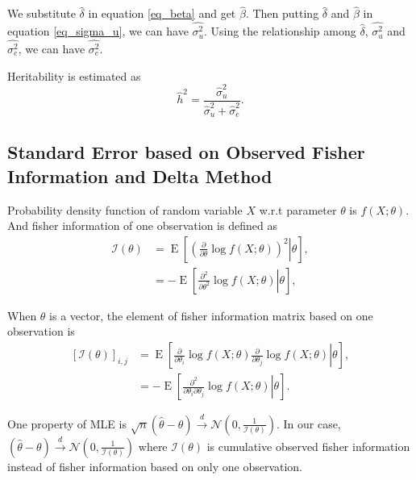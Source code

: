 \documentclass{article}
\begin{document}
We substitute $ \hat{\delta} $ in equation \ref{eq_beta} and get $ \hat{\beta} $. Then putting $ \hat{\delta} $ and $ \hat{\beta} $ in equation \ref{eq_sigma_u}, we can have $ \hat{\sigma^{2}_{u}} $. Using the relationship among $ \hat{\delta} $, $ \hat{\sigma^{2}_{u}} $ and $ \hat{\sigma^{2}_{e}} $, we can have $ \hat{\sigma^{2}_{e}} $.

Heritability is estimated as 
\begin{equation}
\hat{h}^{2} = \frac{\hat{\sigma}^{2}_{u}}{\hat{\sigma}^{2}_{u} + \hat{\sigma}^{2}_{e}}.
\end{equation}

\subsection{Standard Error based on Observed Fisher Information and Delta Method}

Probability density function of random variable $ X $ w.r.t parameter $ \theta $ is $ f(X;\theta) $. And fisher information of one observation is defined as
\begin{align}
	\label{eq_fisherInfo1} \mathcal{I}(\theta) &= \operatorname{E} \left[\left. \left(\frac{\partial}{\partial\theta} \log f(X; \theta) \right)^2 \right| \theta \right], \\
	\label{eq_fisherInfo2} &= - \operatorname{E} \left[\left. \frac{\partial^2}{\partial\theta^2} \log f(X;\theta) \right| \theta \right],
\end{align}

When $ \theta $ is a vector, the element of fisher information matrix based on one observation is
\begin{align}
\label{eq_fisherInfo1_matrix} [\mathcal{I}(\theta)]_{i,j} &= \operatorname{E} \left[\left. \frac{\partial}{\partial\theta_{i}} \log f(X; \theta) \frac{\partial}{\partial\theta_{j}} \log f(X; \theta) \right| \theta \right], \\
\label{eq_fisherInfo2_matrix} &= - \operatorname{E} \left[\left. \frac{\partial^2}{\partial\theta_{i}\partial\theta_{j}} \log f(X;\theta) \right| \theta \right].
\end{align}

One property of MLE is $ \sqrt{n}(\hat{\theta} - \theta) \xrightarrow{d} \mathcal{N}(0, \frac{1}{\mathcal{I}(\theta)} ) $. In our case, $ (\hat{\theta} - \theta) \xrightarrow{d} \mathcal{N}(0, \frac{1}{\mathcal{I}(\theta)} ) $ where $ \mathcal{I}(\theta) $ is cumulative observed fisher information instead of fisher information based on only one observation.
\end{document}
